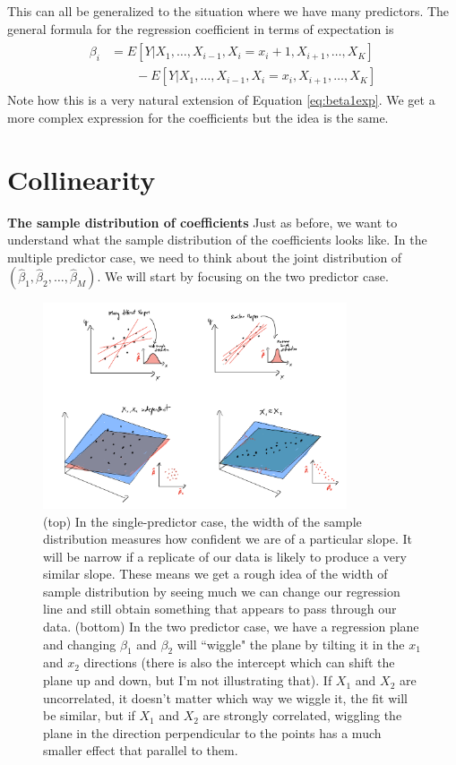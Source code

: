  This can all be generalized to the situation where we have many predictors. The general formula for the regression coefficient in terms of expectation is 
\begin{align*}
\begin{split}
\beta_i &= E[Y|X_1,\dots,X_{i-1},X_i=x_i+1,X_{i+1},\dots,X_K]\\
&\quad\quad - E[Y|X_1,\dots,X_{i-1},X_i=x_i,X_{i+1},\dots,X_K]
\end{split}
\end{align*}
Note how this is a very natural extension of Equation \ref{eq:beta1exp}. 
We get a more complex expression for the coefficients but the idea is the same. 



\section{Collinearity}
 {\bf The sample distribution of coefficients}
Just as before, we want to understand what the sample distribution of the coefficients looks like. In the multiple predictor case, we need to think about the joint distribution  of $(\hat{\beta}_1,\hat{\beta}_2,\dots,\hat{\beta}_M)$. We will start by focusing on the two predictor case.  



\begin{figure}[h]
    \centering
    \includegraphics[width=0.8\textwidth]{./../figures/sample_dist}
    \caption{(top) In the single-predictor case, the width of the sample distribution measures how confident we are of a particular slope. It will be narrow if a replicate of our data is likely to produce a very similar slope.  These means we get a rough idea of the width of sample distribution by seeing much we can change our regression line and still obtain something that appears to pass through our data. (bottom) In the two predictor case, we have a regression plane and changing $\beta_1$ and $\beta_2$ will ``wiggle" the plane by tilting it in the $x_1$ and $x_2$ directions (there is also the intercept which can shift the plane up and down, but I'm not illustrating that). If $X_1$ and $X_2$ are uncorrelated, it doesn't matter which way we wiggle it, the fit will be similar, but if $X_1$ and $X_2$ are strongly correlated, wiggling the plane in the direction perpendicular  to the points has a much smaller effect that parallel to them. }
    \label{fig:sample_dist}
\end{figure}



